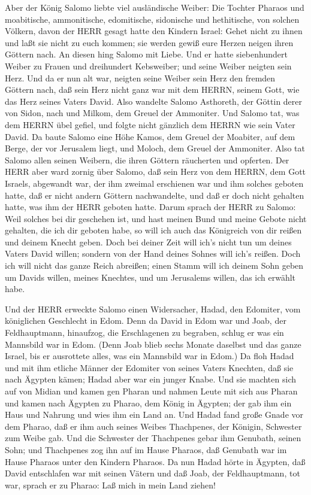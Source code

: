  Aber der König Salomo liebte viel ausländische Weiber: Die
Tochter Pharaos und moabitische, ammonitische, edomitische, sidonische
und hethitische,  von solchen Völkern, davon der HERR gesagt
hatte den Kindern Israel: Gehet nicht zu ihnen und laßt sie nicht zu
euch kommen; sie werden gewiß eure Herzen neigen ihren Göttern nach. An
diesen hing Salomo mit Liebe.  Und er hatte siebenhundert
Weiber zu Frauen und dreihundert Kebsweiber; und seine Weiber neigten
sein Herz.  Und da er nun alt war, neigten seine Weiber sein
Herz den fremden Göttern nach, daß sein Herz nicht ganz war mit dem
HERRN, seinem Gott, wie das Herz seines Vaters David.  Also
wandelte Salomo Asthoreth, der Göttin derer von Sidon, nach und Milkom,
dem Greuel der Ammoniter.  Und Salomo tat, was dem HERRN
übel gefiel, und folgte nicht gänzlich dem HERRN wie sein Vater David.
 Da baute Salomo eine Höhe Kamos, dem Greuel der Moabiter,
auf dem Berge, der vor Jerusalem liegt, und Moloch, dem Greuel der
Ammoniter.  Also tat Salomo allen seinen Weibern, die ihren
Göttern räucherten und opferten.  Der HERR aber ward zornig
über Salomo, daß sein Herz von dem HERRN, dem Gott Israels, abgewandt
war, der ihm zweimal erschienen war  und ihm solches
geboten hatte, daß er nicht andern Göttern nachwandelte, und daß er doch
nicht gehalten hatte, was ihm der HERR geboten hatte. 
Darum sprach der HERR zu Salomo: Weil solches bei dir geschehen ist, und
hast meinen Bund und meine Gebote nicht gehalten, die ich dir geboten
habe, so will ich auch das Königreich von dir reißen und deinem Knecht
geben.  Doch bei deiner Zeit will ich's nicht tun um deines
Vaters David willen; sondern von der Hand deines Sohnes will ich's
reißen.  Doch ich will nicht das ganze Reich abreißen;
einen Stamm will ich deinem Sohn geben um Davids willen, meines
Knechtes, und um Jerusalems willen, das ich erwählt habe.

 Und der HERR erweckte Salomo einen Widersacher, Hadad, den
Edomiter, vom königlichen Geschlecht in Edom.  Denn da
David in Edom war und Joab, der Feldhauptmann, hinaufzog, die
Erschlagenen zu begraben, schlug er was ein Mannsbild war in Edom.
 (Denn Joab blieb sechs Monate daselbst und das ganze
Israel, bis er ausrottete alles, was ein Mannsbild war in Edom.)
 Da floh Hadad und mit ihm etliche Männer der Edomiter von
seines Vaters Knechten, daß sie nach Ägypten kämen; Hadad aber war ein
junger Knabe.  Und sie machten sich auf von Midian und
kamen gen Pharan und nahmen Leute mit sich aus Pharan und kamen nach
Ägypten zu Pharao, dem König in Ägypten; der gab ihm ein Haus und
Nahrung und wies ihm ein Land an.  Und Hadad fand große
Gnade vor dem Pharao, daß er ihm auch seines Weibes Thachpenes, der
Königin, Schwester zum Weibe gab.  Und die Schwester der
Thachpenes gebar ihm Genubath, seinen Sohn; und Thachpenes zog ihn auf
im Hause Pharaos, daß Genubath war im Hause Pharaos unter den Kindern
Pharaos.  Da nun Hadad hörte in Ägypten, daß David
entschlafen war mit seinen Vätern und daß Joab, der Feldhauptmann, tot
war, sprach er zu Pharao: Laß mich in mein Land ziehen!

